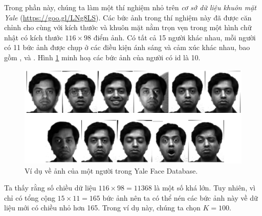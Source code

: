 Trong phần này, chúng ta làm một thí nghiệm nhỏ trên \textit{cơ sở dữ liệu
khuôn mặt Yale} (\url{https://goo.gl/LNg8LS}). Các bức ảnh trong thí nghiệm
này đã được căn chỉnh cho cùng với kích thước và khuôn mặt nằm trọn vẹn trong
một hình chữ nhật có kích thước $116 \times  98$ điểm ảnh. Có tất cả 15 người khác
nhau, mỗi người có 11 bức ảnh được chụp ở các điều kiện ánh sáng và cảm xúc khác
nhau, bao gồm , và
. Hình \ref{fig:28_1} minh hoạ các bức ảnh của
người có id là 10.


\begin{figure}[t]
\centering
\includegraphics[width = \textwidth]{Chapters/07_DimemsionalityReduction/28_pca2/latex/yaleb_exs.pdf}
\caption[]{Ví dụ về ảnh của một người trong Yale Face Database.}
\label{fig:28_1}
\end{figure}
Ta thấy rằng số chiều dữ liệu $116 \times 98 = 11368$ là một số khá
lớn. Tuy nhiên, vì chỉ có tổng cộng $15 \times 11 = 165$ bức ảnh nên ta có thể
nén các bức ảnh này về dữ liệu mới có chiều nhỏ hơn 165. Trong ví dụ này, chúng
ta chọn $K = 100$.

